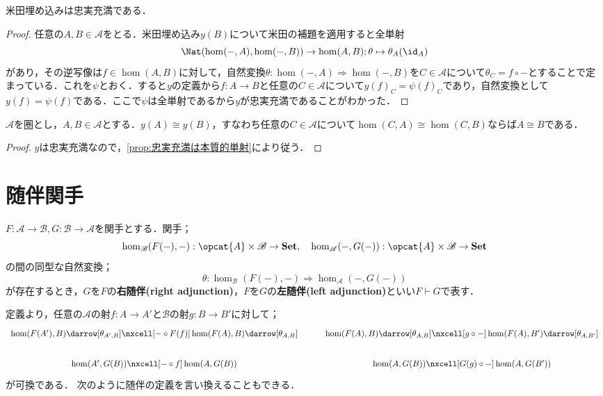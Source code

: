 \begin{prop}
	米田埋め込みは忠実充満である．
\end{prop}

\begin{proof}
	任意の$A,B\in\mathscr{A}$をとる．米田埋め込み$y(B)$について米田の補題を適用すると全単射
	\[\Nat(\hom(-,A),\hom(-,B))\to\hom(A,B);\theta\mapsto\theta_A(\id_A)\]
	があり，その逆写像は$f\in\hom(A,B)$に対して，自然変換$\theta:\hom(-,A)\Rightarrow\hom(-,B)$を$C\in\mathscr{A}$について$\theta_C=f\circ -$とすることで定まっている．これを$\psi$とおく．すると$y$の定義から$f:A\to B$と任意の$C\in\mathscr{A}$について$y(f)_C=\psi(f)_C$であり，自然変換として$y(f)=\psi(f)$である．ここで$\psi$は全単射であるから$y$が忠実充満であることがわかった．
\end{proof}

\begin{cor}
	$\mathscr{A}$を圏とし，$A,B\in\mathscr{A}$とする．$y(A)\cong y(B)$，すなわち任意の$C\in\mathscr{A}$について$\hom(C,A)\cong\hom(C,B)$ならば$A\cong B$である．
\end{cor}

\begin{proof}
	$y$は忠実充満なので，\ref{prop:忠実充満は本質的単射}により従う．
\end{proof}

\section{随伴関手}

\begin{defi}[随伴]
	$F:\mathscr{A}\to\mathscr{B},G:\mathscr{B}\to\mathscr{A}$を関手とする．関手；
	\[\hom_{\mathscr{B}}(F(-),-):\opcat{{A}}\times\mathscr{B}\to\mathbf{Set},\quad\hom_{\mathscr{A}}(-,G(-)):\opcat{{A}}\times\mathscr{B}\to\mathbf{Set}\]
	の間の同型な自然変換；
	\[\theta:\hom_{\mathscr{B}}(F(-),-)\Rightarrow\hom_{\mathscr{A}}(-,G(-))\]
	が存在するとき，$G$を$F$の\textbf{右随伴(right adjunction)}，$F$を$G$の\textbf{左随伴(left adjunction)}といい$F\vdash G$で表す．
\end{defi}

定義より，任意の$\mathscr{A}$の射$f:A\to A'$と$\mathscr{B}$の射$g:B\to B'$に対して；
\[\begin{tikzcd}
	\hom(F(A'),B)\darrow[\theta_{A',B}]\nxcell[-\circ F(f)]\hom(F(A),B)\darrow[\theta_{A,B}]&\hom(F(A),B)\darrow[\theta_{A,B}]\nxcell[g\circ-]\hom(F(A),B')\darrow[\theta_{A,B'}]\\
	\hom(A',G(B))\nxcell[-\circ f]\hom(A,G(B))&\hom(A,G(B))\nxcell[G(g)\circ -]\hom(A,G(B'))
\end{tikzcd}\]
が可換である．
次のように随伴の定義を言い換えることもできる．

